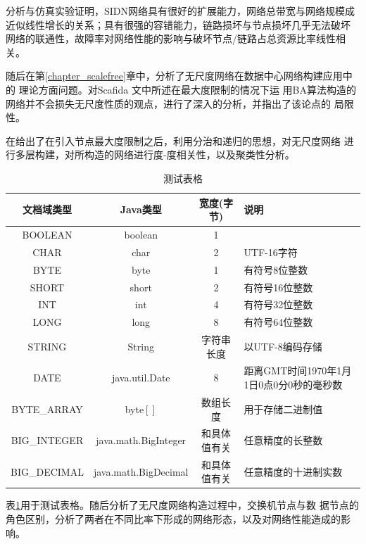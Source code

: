 \documentclass[bachelor,winfonts]{jnuthesis} %
\begin{document}
    分析与仿真实验证明，SIDN网络具有很好的扩展能力，网络总带宽与网络规模成
    近似线性增长的关系；具有很强的容错能力，链路损坏与节点损坏几乎无法破坏
    网络的联通性，故障率对网络性能的影响与破坏节点/链路占总资源比率线性相关。
    
    随后在第\ref{chapter_scalefree}章中，分析了无尺度网络在数据中心网络构建应用中的
    理论方面问题。对Scafida \cite{gyarmati2010scafida}文中所述在最大度限制的情况下运
    用BA算法构造的网络并不会损失无尺度性质的观点，进行了深入的分析，并指出了该论点的
    局限性。
    
    在给出了在引入节点最大度限制之后，利用分治和递归的思想，对无尺度网络
    进行多层构建，对所构造的网络进行度-度相关性，以及聚类性分析。
    
    \begin{table}
        \centering
        \begin{tabular}{cccp{38mm}}
            \toprule
            \textbf{文档域类型} & \textbf{Java类型} & \textbf{宽度(字节)} & \textbf{说明} \\
            \midrule
            BOOLEAN  & boolean &  1  & \\
            CHAR     & char    &  2  & UTF-16字符 \\
            BYTE     & byte    &  1  & 有符号8位整数 \\
            SHORT    & short   &  2  & 有符号16位整数 \\
            INT      & int     &  4  & 有符号32位整数 \\
            LONG     & long    &  8  & 有符号64位整数 \\
            STRING   & String  &  字符串长度  & 以UTF-8编码存储 \\
            DATE     & java.util.Date & 8 & 距离GMT时间1970年1月1日0点0分0秒的毫秒数 \\
            BYTE\_ARRAY & byte$[]$ & 数组长度 & 用于存储二进制值 \\
            BIG\_INTEGER & java.math.BigInteger & 和具体值有关 & 任意精度的长整数 \\
            BIG\_DECIMAL & java.math.BigDecimal & 和具体值有关 & 任意精度的十进制实数 \\
            \bottomrule
        \end{tabular}
        \caption{测试表格}\label{table:test5}
    \end{table}
    
    表\ref{table:test5}用于测试表格。随后分析了无尺度网络构造过程中，交换机节点与数
    据节点的角色区别，分析了两者在不同比率下形成的网络形态，以及对网络性能造成的影响。
    
\end{document}
